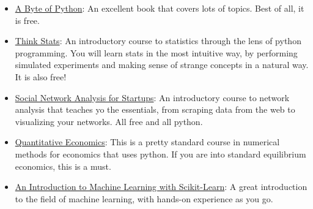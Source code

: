\documentclass[11pt]{article}
\begin{document}
\begin{itemize}
\item \href{http://www.swaroopch.com/notes/python/}{A Byte of Python}: An excellent book that covers lots of topics. Best of all, it is free.
\item \href{http://greenteapress.com/thinkstats/}{Think Stats}: An introductory course to statistics through the lens of python programming. You will learn stats in the most intuitive way, by performing simulated experiments  and making sense of strange concepts in a natural way. It is also free!
\item \href{http://mediashow.ru/sites/default/files/books/2011/11/social.network.analysis.for_.startups.1449306462.pdf}{Social Network Analysis for Startups}: An introductory course to network analysis that teaches yo the essentials, from scraping data from the web to visualizing your networks. All free and all python.
\item \href{http://quant-econ.net/py/index.html}{Quantitative Economics}: This is a pretty standard course in numerical methods for economics that uses python. If you are into standard equilibrium economics, this is a must.
\item \href{http://scikit-learn.org/stable/tutorial/basic/tutorial.html}{An Introduction to Machine Learning with Scikit-Learn}: A great introduction to the field of machine learning, with hands-on experience as you go.
\end{itemize}
 
\end{document}
